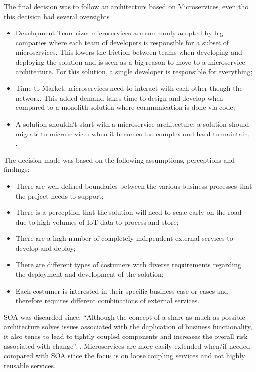 The final decision was to follow an architecture based on Microservices, even tho this decision had several oversights:

\begin{itemize}
   \item Development Team size: microservices are commonly adopted by big companies where each team of developers is responsible for a subset of microservices. This lowers the friction between teams when developing and deploying the solution and is seen as a big reason to move to a microservice architecture. For this solution, a single developer is responsible for everything;
   \item Time to Market: microservices need to interact with each other though the network. This added demand takes time to design and develop when compared to a monolith solution where communication is done via code;
   \item A solution shouldn't start with a microservice architecture: a solution should migrate to microservices when it becomes too complex and hard to maintain, \cite{ibmmicro}.
\end{itemize}

The decision made was based on the following assumptions, perceptions and findings:

\begin{itemize}
   \item There are well defined boundaries between the various business processes that the project needs to support;
   \item There is a perception that the solution will need to scale early on the road due to high volumes of \gls{IoT} data to process and store;
   \item There are a high number of completely independent external services to develop and deploy;
   \item There are different types of costumers with diverse requirements regarding the deployment and development of the solution;
   \item Each costumer is interested in their specific business case or cases and therefore requires different combinations of external services.
\end{itemize}

\gls{SOA} was discarded since: ``Although the concept of a share-as-much-as-possible architecture solves issues associated with the duplication of business functionality, it also tends to lead to tightly coupled components and increases the overall risk associated with change''. \parencite{richards2015microservices}. Microservices are more easily extended when/if needed compared with \gls{SOA} since the focus is on loose coupling services and not highly reusable services.

